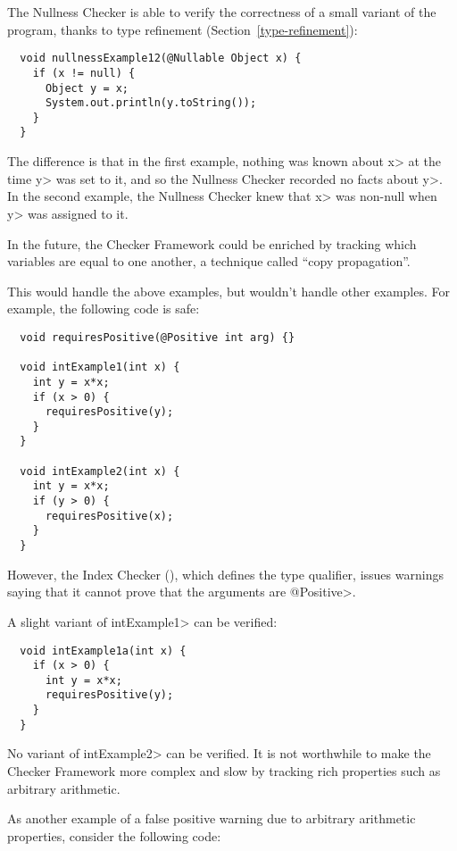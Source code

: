 The Nullness Checker is able to verify the correctness of a small variant
of the program, thanks to type refinement
(Section~\ref{type-refinement}):

\begin{Verbatim}
  void nullnessExample12(@Nullable Object x) {
    if (x != null) {
      Object y = x;
      System.out.println(y.toString());
    }
  }
\end{Verbatim}

The difference is that in the first example, nothing was known about \<x> at
the time \<y> was set to it, and so the Nullness Checker recorded no facts
about \<y>.  In the second example, the Nullness Checker knew that \<x>
was non-null when \<y> was assigned to it.

In the future, the Checker Framework could be enriched by tracking which
variables are equal to one another, a technique called ``copy
propagation''.

This would handle the above examples, but wouldn't handle other examples.
For example, the following code is safe:

\begin{Verbatim}
  void requiresPositive(@Positive int arg) {}

  void intExample1(int x) {
    int y = x*x;
    if (x > 0) {
      requiresPositive(y);
    }
  }

  void intExample2(int x) {
    int y = x*x;
    if (y > 0) {
      requiresPositive(x);
    }
  }
\end{Verbatim}

\noindent
However, the Index Checker (), which defines the
 type qualifier, issues warnings
saying that it cannot prove that the arguments are \<@Positive>.

A slight variant of \<intExample1> can be verified:

\begin{Verbatim}
  void intExample1a(int x) {
    if (x > 0) {
      int y = x*x;
      requiresPositive(y);
    }
  }
\end{Verbatim}

\noindent
No variant of \<intExample2> can be verified.  It is not worthwhile to make
the Checker Framework more complex and slow by tracking rich properties
such as arbitrary arithmetic.

As another example of a false positive warning due to arbitrary arithmetic
properties, consider the following code:

